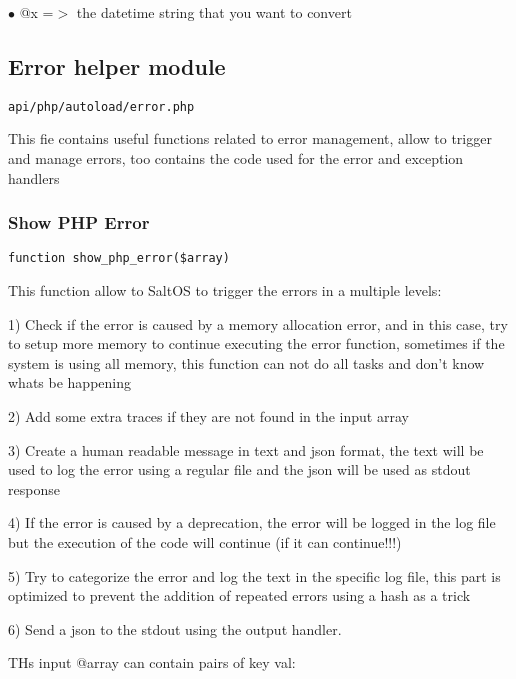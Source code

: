 \documentclass[a4paper]{article}
\begin{document}
\begin{compactitem}
\item[\color{myblue}$\bullet$] @x =$>$ the datetime string that you want to convert
\end{compactitem}

\hypertarget{toc111}{}
\subsection{Error helper module}

\begin{lstlisting}
api/php/autoload/error.php
\end{lstlisting}

This fie contains useful functions related to error management, allow to trigger and manage
errors, too contains the code used for the error and exception handlers

\hypertarget{toc112}{}
\subsubsection{Show PHP Error}

\begin{lstlisting}
function show_php_error($array)
\end{lstlisting}

This function allow to SaltOS to trigger the errors in a multiple levels:

1) Check if the error is caused by a memory allocation error, and in this case, try
to setup more memory to continue executing the error function, sometimes if the system
is using all memory, this function can not do all tasks and don't know whats be happening

2) Add some extra traces if they are not found in the input array

3) Create a human readable message in text and json format, the text will be used
to log the error using a regular file and the json will be used as stdout response

4) If the error is caused by a deprecation, the error will be logged in the log file
but the execution of the code will continue (if it can continue!!!)

5) Try to categorize the error and log the text in the specific log file, this part
is optimized to prevent the addition of repeated errors using a hash as a trick

6) Send a json to the stdout using the output handler.

THs input @array can contain pairs of key val:
\end{document}
